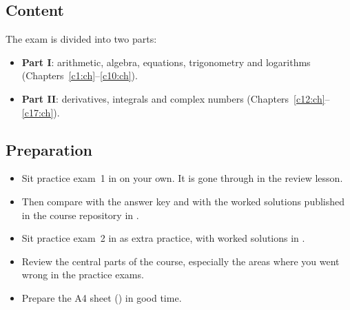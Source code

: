 \subsection{Content}
\label{c19:sec:innehall}
The exam is divided into two parts:
\begin{itemize}
  \item \textbf{Part I}: arithmetic, algebra, equations, trigonometry and logarithms
    (Chapters~\ref{c1:ch}--\ref{c10:ch}).
  \item \textbf{Part II}: derivatives, integrals and complex numbers
    (Chapters~\ref{c12:ch}--\ref{c17:ch}).
\end{itemize}

\subsection{Preparation}
\label{c19:sec:forberedelse}
\begin{itemize}
  \item Sit practice exam~1 in  on your own. It is gone through
    in the review lesson.
  \item Then compare with the answer key and with the worked solutions published in the course
    repository in .
  \item Sit practice exam~2 in  as extra practice, with worked
    solutions in .
  \item Review the central parts of the course, especially the areas where you went wrong in the
    practice exams.
  \item Prepare the A4 sheet () in good time.
\end{itemize}
